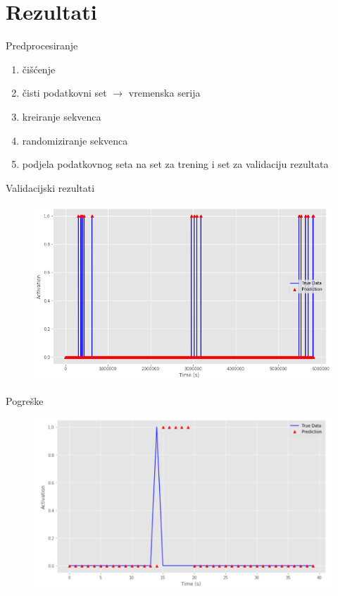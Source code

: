 \documentclass{beamer}
\begin{document}
  \section{Rezultati}
  \begin{frame}{Predprocesiranje}
    \begin{enumerate}
      \item čišćenje
      \item čisti podatkovni set $\rightarrow$ vremenska serija
      \item kreiranje sekvenca
      \item randomiziranje sekvenca 
      \item podjela podatkovnog seta na set za trening i set za validaciju rezultata
    \end{enumerate}
  \end{frame}

  \begin{frame}{Validacijski rezultati}
    \begin{figure}[]
      \centering
      \includegraphics[width=\linewidth]{images/lstm-out.png}
    \end{figure}
  \end{frame}

  \begin{frame}{Pogreške}
    \begin{figure}[]
      \centering
      \includegraphics[width=\linewidth]{images/err.png}
    \end{figure}
  \end{frame}
\end{document}
